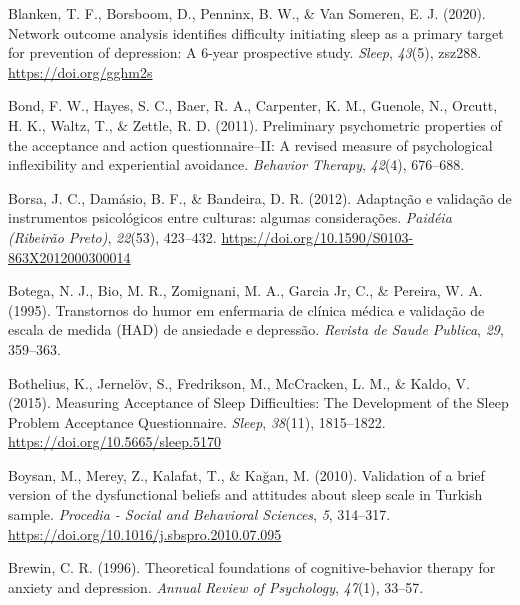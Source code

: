 \documentclass[
  ,doc,11pt, twoside,floatsintext]{apa6}
\newlength{\cslhangindent}
\newlength{\cslentryspacingunit} %
\newenvironment{CSLReferences}[2] %
 {%
  \setlength{\parindent}{0pt}
  \ifodd #1
  \let\oldpar\par
  \def\par{\hangindent=\cslhangindent\oldpar}
  \fi
  \setlength{\parskip}{#2\cslentryspacingunit}
 }%
 {}
\begin{document}
\begin{CSLReferences}{1}{0}
\leavevmode{}%
Blanken, T. F., Borsboom, D., Penninx, B. W., \& Van Someren, E. J. (2020). Network outcome analysis identifies difficulty initiating sleep as a primary target for prevention of depression: A 6-year prospective study. \emph{Sleep}, \emph{43}(5), zsz288. \url{https://doi.org/gghm2s}

\leavevmode{}%
Bond, F. W., Hayes, S. C., Baer, R. A., Carpenter, K. M., Guenole, N., Orcutt, H. K., Waltz, T., \& Zettle, R. D. (2011). Preliminary psychometric properties of the acceptance and action questionnaire--II: A revised measure of psychological inflexibility and experiential avoidance. \emph{Behavior Therapy}, \emph{42}(4), 676--688.

\leavevmode{}%
Borsa, J. C., Damásio, B. F., \& Bandeira, D. R. (2012). {Adaptação e validação de instrumentos psicológicos entre culturas: algumas considerações}. \emph{Paidéia (Ribeirão Preto)}, \emph{22}(53), 423--432. \url{https://doi.org/10.1590/S0103-863X2012000300014}

\leavevmode{}%
Botega, N. J., Bio, M. R., Zomignani, M. A., Garcia Jr, C., \& Pereira, W. A. (1995). Transtornos do humor em enfermaria de clínica médica e validação de escala de medida (HAD) de ansiedade e depressão. \emph{Revista de Saude Publica}, \emph{29}, 359--363.

\leavevmode{}%
Bothelius, K., Jernelöv, S., Fredrikson, M., McCracken, L. M., \& Kaldo, V. (2015). Measuring {Acceptance} of {Sleep Difficulties}: {The Development} of the {Sleep Problem Acceptance Questionnaire}. \emph{Sleep}, \emph{38}(11), 1815--1822. \url{https://doi.org/10.5665/sleep.5170}

\leavevmode{}%
Boysan, M., Merey, Z., Kalafat, T., \& Kağan, M. (2010). Validation of a brief version of the dysfunctional beliefs and attitudes about sleep scale in {Turkish} sample. \emph{Procedia - Social and Behavioral Sciences}, \emph{5}, 314--317. \url{https://doi.org/10.1016/j.sbspro.2010.07.095}

\leavevmode{}%
Brewin, C. R. (1996). Theoretical foundations of cognitive-behavior therapy for anxiety and depression. \emph{Annual Review of Psychology}, \emph{47}(1), 33--57.


\end{CSLReferences}
\end{document}
